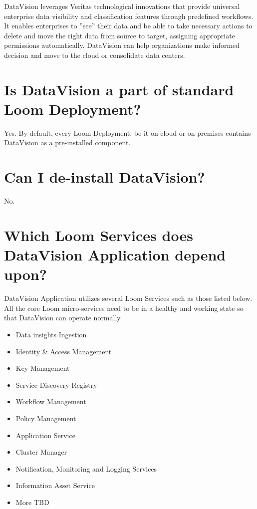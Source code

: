 \documentclass[letterpaper,10pt,english]{sphinxmanual}
\begin{document}
DataVision leverages Veritas technological innovations that provide universal enterprise data visibility and classification features through predefined workflows. It enables enterprises to ”see” their data and be able to take necessary actions to delete and move the right data from source to target, assigning appropriate permissions automatically. DataVision can help organizations make informed decision and move to the cloud or consolidate data centers.


\section{Is DataVision a part of standard Loom Deployment?}
\label{\detokenize{loom_trbs_faq:is-datavision-a-part-of-standard-loom-deployment}}
Yes. By default, every Loom Deployment, be it on cloud or on-premises contains DataVision as a pre-installed component.


\section{Can I de-install DataVision?}
\label{\detokenize{loom_trbs_faq:can-i-de-install-datavision}}
No.


\section{Which Loom Services does DataVision Application depend upon?}
\label{\detokenize{loom_trbs_faq:which-loom-services-does-datavision-application-depend-upon}}
DataVision Application utilizes several Loom Services such as those listed below. All the core Loom micro-services need to be in a healthy and working state so that DataVision can operate normally.
\begin{itemize}
\item {} 
Data insights Ingestion

\item {} 
Identity \& Access Management

\item {} 
Key Management

\item {} 
Service Discovery Registry

\item {} 
Workflow Management

\item {} 
Policy Management

\item {} 
Application Service

\item {} 
Cluster Manager

\item {} 
Notification, Monitoring and Logging Services

\item {} 
Information Asset Service

\item {} 
More TBD

\end{itemize}
\end{document}
